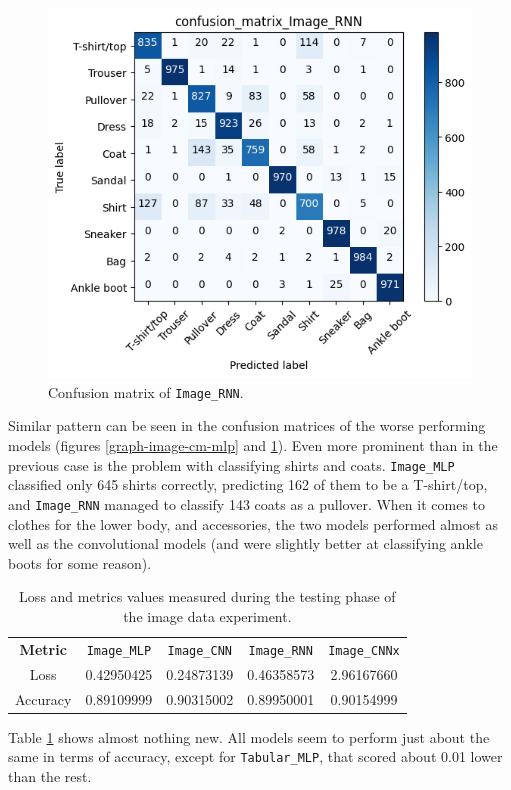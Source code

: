 \begin{figure}[!ht]
\begin{minipage}{0.48\textwidth}
        \includegraphics[width=\linewidth]{obrazky-figures/Image_experiment/confusion_matrix_Image_RNN_2023-03-27_21:34:32.png}
        \caption{Confusion matrix of \texttt{Image\_RNN}.}
        \label{graph-image-cm-rnn}
    \end{minipage}
\end{figure}
Similar pattern can be seen in the confusion matrices of the worse performing models (figures \ref{graph-image-cm-mlp}
and \ref{graph-image-cm-rnn}). Even more prominent than in
the previous case is the problem with classifying shirts and coats. \texttt{Image\_MLP} classified only
645 shirts correctly, predicting 162 of them to be a T-shirt/top, and \texttt{Image\_RNN} managed to classify
143 coats as a pullover. When it comes to clothes for the lower body, and accessories, the two models
performed almost as well as the convolutional models (and were slightly better at classifying ankle boots for
some reason).


\begin{table}[!h]
\centering
\begin{tabular}{|c|c|c|c|c|}
    \cline{1-5}
    \textbf{Metric} & \texttt{Image\_MLP} & \texttt{Image\_CNN} & \texttt{Image\_RNN} & \texttt{Image\_CNNx} \\
    \cline{1-5}
    Loss & 0.42950425 & 0.24873139 & 0.46358573 & 2.96167660 \\
    \cline{1-5}
    Accuracy & 0.89109999 & 0.90315002 & 0.89950001 & 0.90154999 \\
    \cline{1-5}
\end{tabular}
\caption{Loss and metrics values measured during the testing phase of the image data experiment.}
\label{table:image-test}
\end{table}
Table \ref{table:image-test} shows almost nothing new. All models seem to perform just about the same in terms
of accuracy, except for \texttt{Tabular\_MLP}, that scored about 0.01 lower than the rest.


